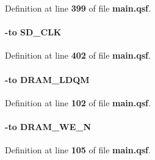 Definition at line {\bf 399} of file {\bf main.\+qsf}.

\paragraph[{P\+I\+N\+\_\+\+A\+D25}]{ {\bfseries \textcolor{vhdlchar}{-\/}\textcolor{keywordflow}{to}\textcolor{vhdlchar}{ }\textcolor{vhdlchar}{S\+D\+\_\+\+C\+LK}\textcolor{vhdlchar}{ }}\hspace{0.3cm}{\ttfamily [Constraints]}}\label{main_8qsf_a208416073b6c667ae7171ce8e044abb7}


Definition at line {\bf 402} of file {\bf main.\+qsf}.

\paragraph[{P\+I\+N\+\_\+\+A\+D2}]{ {\bfseries \textcolor{vhdlchar}{-\/}\textcolor{keywordflow}{to}\textcolor{vhdlchar}{ }\textcolor{vhdlchar}{D\+R\+A\+M\+\_\+\+L\+D\+QM}\textcolor{vhdlchar}{ }}\hspace{0.3cm}{\ttfamily [Constraints]}}\label{main_8qsf_a07b9cf3579110adafaa64f42778a6c7a}


Definition at line {\bf 102} of file {\bf main.\+qsf}.

\paragraph[{P\+I\+N\+\_\+\+A\+D3}]{ {\bfseries \textcolor{vhdlchar}{-\/}\textcolor{keywordflow}{to}\textcolor{vhdlchar}{ }\textcolor{vhdlchar}{D\+R\+A\+M\+\_\+\+W\+E\+\_\+N}\textcolor{vhdlchar}{ }}\hspace{0.3cm}{\ttfamily [Constraints]}}\label{main_8qsf_a01388513a7356760e1dd3636c0a2d2fd}


Definition at line {\bf 105} of file {\bf main.\+qsf}.

